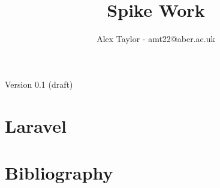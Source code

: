\documentclass{article}
\title{Spike Work}
\author{Alex Taylor - amt22@aber.ac.uk}
\begin{document}
\maketitle
\begin{center}
	Version 0.1 (draft)
\end{center}
\tableofcontents
\thispagestyle{empty}
\newpage

\section{Laravel}
\newpage

\section{Bibliography}



\end{document}
